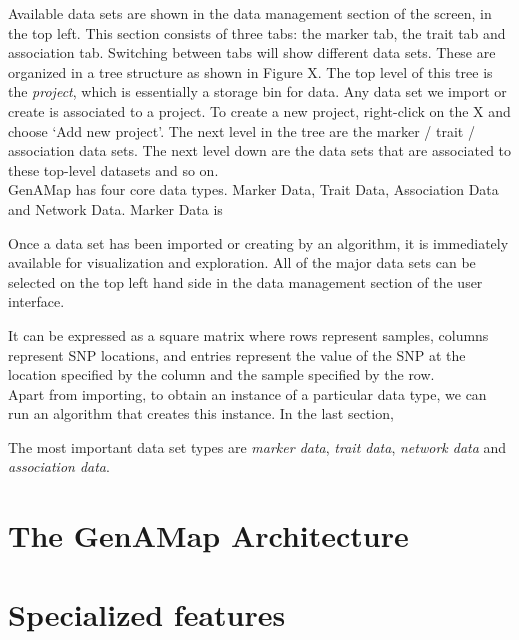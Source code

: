 \documentclass[12pt]{article}
\begin{document}
Available data sets are shown in the data management section of the screen, in the top left. This section consists of three tabs: the marker tab, the trait tab and association tab. Switching between tabs will show different data sets. These are organized in a tree structure as shown in Figure X. The top level of this tree is the {\it project}, which is essentially a storage bin for data. Any data set we import or create is associated to a project. To create a new project, right-click on the X and choose `Add new project'. The next level in the tree are the marker / trait / association data sets. The next level down are the data sets that are associated to these top-level datasets and so on.\\

GenAMap has four core data types. Marker Data, Trait Data, Association Data and Network Data. Marker Data is 


Once a data set has been imported or creating by an algorithm, it is immediately available for visualization and exploration. All of the major data sets can be selected on the top left hand side in the data management section of the user interface. 



It can be expressed as a square matrix where rows represent samples, columns represent SNP locations, and entries represent the value of the SNP at the location specified by the column and the sample specified by the row. \\

Apart from importing, to obtain an instance of a particular data type, we can run an algorithm that creates this instance. In the last section, 


The most important data set types are {\it marker data}, {\it trait data}, {\it network data} and {\it association data}. 

\section{The GenAMap Architecture}

\section{Specialized features}
\end{document}
